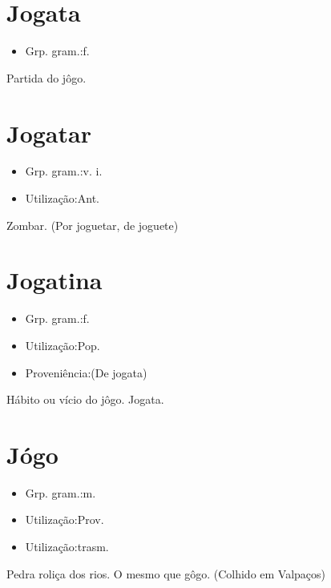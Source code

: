 \documentclass{article}
\begin{document}
\section{Jogata}
\begin{itemize}
\item {Grp. gram.:f.}
\end{itemize}
Partida do jôgo.
\section{Jogatar}
\begin{itemize}
\item {Grp. gram.:v. i.}
\end{itemize}
\begin{itemize}
\item {Utilização:Ant.}
\end{itemize}
Zombar.
(Por \textunderscore joguetar\textunderscore , de \textunderscore joguete\textunderscore )
\section{Jogatina}
\begin{itemize}
\item {Grp. gram.:f.}
\end{itemize}
\begin{itemize}
\item {Utilização:Pop.}
\end{itemize}
\begin{itemize}
\item {Proveniência:(De \textunderscore jogata\textunderscore )}
\end{itemize}
Hábito ou vício do jôgo.
Jogata.
\section{Jógo}
\begin{itemize}
\item {Grp. gram.:m.}
\end{itemize}
\begin{itemize}
\item {Utilização:Prov.}
\end{itemize}
\begin{itemize}
\item {Utilização:trasm.}
\end{itemize}
Pedra roliça dos rios.
O mesmo que \textunderscore gôgo\textunderscore .
(Colhido em Valpaços)
\end{document}
